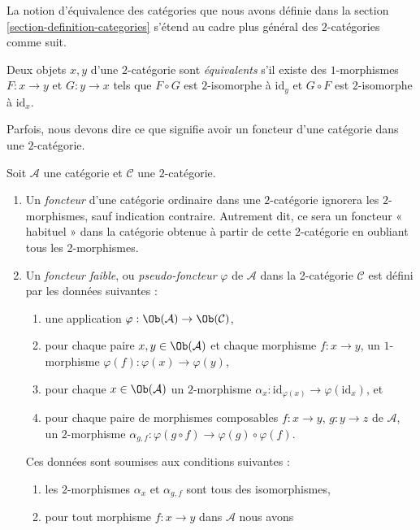 \noindent
La notion d'équivalence des catégories que nous avons définie dans la section
\ref{section-definition-categories} s'étend au cadre plus général des
$2$-catégories comme suit.

\begin{definition}
\label{definition-equivalence}
Deux objets $x, y$ d'une $2$-catégorie sont {\it équivalents} s'il existe des
$1$-morphismes $F : x \to y$ et $G : y \to x$ tels que $F \circ G$ est
$2$-isomorphe à $\text{id}_y$ et $G \circ F$ est $2$-isomorphe à
$\text{id}_x$.
\end{definition}

\noindent
Parfois, nous devons dire ce que signifie avoir un foncteur d'une catégorie
dans une $2$-catégorie.

\begin{definition}
\label{definition-functor-into-2-category}
Soit $\mathcal{A}$ une catégorie et $\mathcal{C}$ une $2$-catégorie.
\begin{enumerate}
\item Un {\it foncteur} d'une catégorie ordinaire dans une $2$-catégorie
ignorera les $2$-morphismes, sauf indication contraire. Autrement dit, ce sera
un foncteur « habituel » dans la catégorie obtenue à partir de cette 2-catégorie en oubliant
tous les 2-morphismes.
\item Un {\it foncteur faible}, ou {\it pseudo-foncteur} $\varphi$ de
$\mathcal{A}$ dans la 2-catégorie $\mathcal{C}$ est défini par les données
suivantes :
\begin{enumerate}
\item une application $\varphi : \Ob(\mathcal{A}) \to \Ob(\mathcal{C})$,
\item pour chaque paire $x, y\in \Ob(\mathcal{A})$ et chaque morphisme $f : x \to y$, un $1$-morphisme $\varphi(f) : \varphi(x) \to \varphi(y)$,
\item pour chaque $x\in \Ob(\mathcal{A})$ un $2$-morphisme $\alpha_x : \text{id}_{\varphi(x)} \to \varphi(\text{id}_x)$, et
\item pour chaque paire de morphismes composables $f : x \to y$, $g : y \to z$
de $\mathcal{A}$, un $2$-morphisme $\alpha_{g, f} : \varphi(g \circ f) \to \varphi(g) \circ \varphi(f)$.
\end{enumerate}
Ces données sont soumises aux conditions suivantes :
\begin{enumerate}
\item les $2$-morphismes $\alpha_x$ et $\alpha_{g, f}$ sont tous des
isomorphismes,
\item pour tout morphisme $f : x \to y$ dans $\mathcal{A}$ nous avons

\end{enumerate}
\end{enumerate}
\end{definition}
